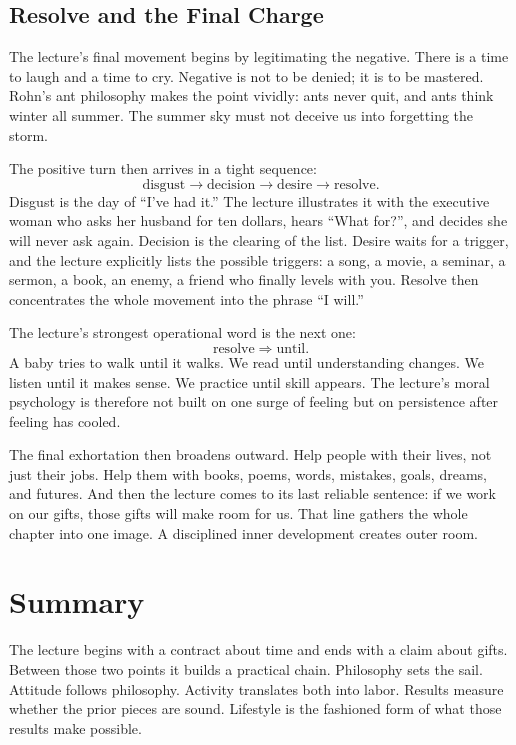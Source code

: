 \subsection{Resolve and the Final Charge}

The lecture's final movement begins by legitimating the negative. There is a time to laugh and a time to cry. Negative is not to be denied; it is to be mastered. Rohn's ant philosophy makes the point vividly: ants never quit, and ants think winter all summer. The summer sky must not deceive us into forgetting the storm.

The positive turn then arrives in a tight sequence:
\begin{equation}
\text{disgust} \to \text{decision} \to \text{desire} \to \text{resolve}.
\end{equation}
Disgust is the day of ``I've had it.'' The lecture illustrates it with the executive woman who asks her husband for ten dollars, hears ``What for?'', and decides she will never ask again. Decision is the clearing of the list. Desire waits for a trigger, and the lecture explicitly lists the possible triggers: a song, a movie, a seminar, a sermon, a book, an enemy, a friend who finally levels with you. Resolve then concentrates the whole movement into the phrase ``I will.''

The lecture's strongest operational word is the next one:
\begin{equation}
\text{resolve} \Rightarrow \text{until}.
\end{equation}
A baby tries to walk until it walks. We read until understanding changes. We listen until it makes sense. We practice until skill appears. The lecture's moral psychology is therefore not built on one surge of feeling but on persistence after feeling has cooled.

The final exhortation then broadens outward. Help people with their lives, not just their jobs. Help them with books, poems, words, mistakes, goals, dreams, and futures. And then the lecture comes to its last reliable sentence: if we work on our gifts, those gifts will make room for us. That line gathers the whole chapter into one image. A disciplined inner development creates outer room.

\section{Summary}

The lecture begins with a contract about time and ends with a claim about gifts. Between those two points it builds a practical chain. Philosophy sets the sail. Attitude follows philosophy. Activity translates both into labor. Results measure whether the prior pieces are sound. Lifestyle is the fashioned form of what those results make possible.

